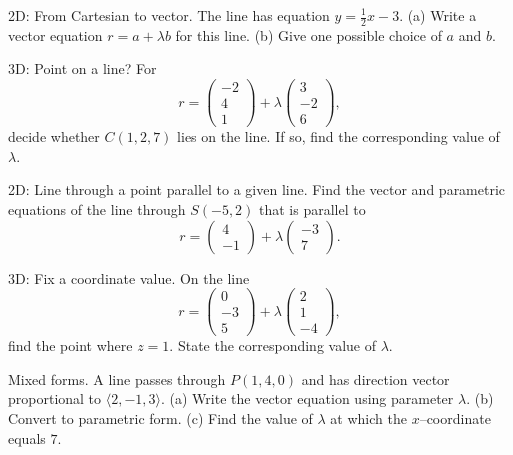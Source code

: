 \documentclass[11pt]{article}
\def\textbf#1{#1}%
\def\mathbf#1{#1}%
\newcounter{question}
\begin{document}
\begin{question}
\textbf{2D: From Cartesian to vector.}
The line has equation $y=\tfrac{1}{2}x-3$.  
(a) Write a vector equation $\mathbf{r}=\mathbf{a}+\lambda\mathbf{b}$ for this line.  
(b) Give one possible choice of $\mathbf{a}$ and $\mathbf{b}$.
\end{question}

\begin{question}
\textbf{3D: Point on a line?}
For
\[
\mathbf{r}=\begin{pmatrix}-2\\4\\1\end{pmatrix}+\lambda\begin{pmatrix}3\\-2\\6\end{pmatrix},
\]
decide whether $C(1,2,7)$ lies on the line. If so, find the corresponding value of $\lambda$.
\end{question}

\begin{question}
\textbf{2D: Line through a point parallel to a given line.}
Find the vector and parametric equations of the line through $S(-5,2)$ that is parallel to
\[
\mathbf{r}=\begin{pmatrix}4\\-1\end{pmatrix}+\lambda\begin{pmatrix}-3\\7\end{pmatrix}.
\]
\end{question}

\begin{question}
\textbf{3D: Fix a coordinate value.}
On the line
\[
\mathbf{r}=\begin{pmatrix}0\\-3\\5\end{pmatrix}+\lambda\begin{pmatrix}2\\1\\-4\end{pmatrix},
\]
find the point where $z=1$. State the corresponding value of $\lambda$.
\end{question}

\begin{question}
\textbf{Mixed forms.}
A line passes through $P(1,4,0)$ and has direction vector proportional to $\langle 2,-1,3\rangle$.  
(a) Write the vector equation using parameter $\lambda$.  
(b) Convert to parametric form.  
(c) Find the value of $\lambda$ at which the $x$–coordinate equals $7$.
\end{question}
\end{document}
